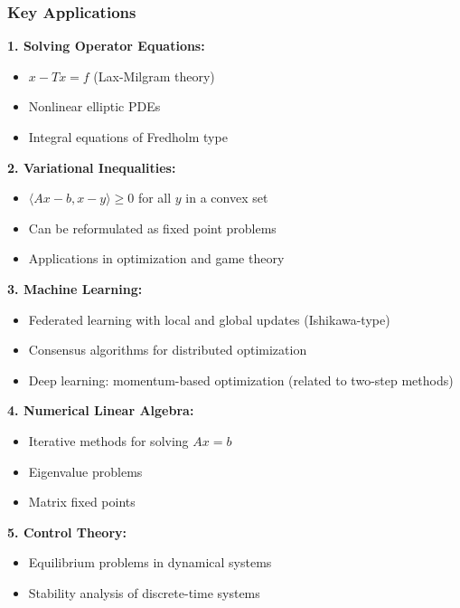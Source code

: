 \documentclass[aspectratio=169,10pt]{beamer}
\begin{document}
\begin{frame}
\frametitle{Key Applications}

\textbf{1. Solving Operator Equations:}
\begin{itemize}
    \item $x - Tx = f$ (Lax-Milgram theory)
    \item Nonlinear elliptic PDEs
    \item Integral equations of Fredholm type
\end{itemize}

\vspace{0.3cm}

\textbf{2. Variational Inequalities:}
\begin{itemize}
    \item $\langle Ax - b, x - y \rangle \geq 0$ for all $y$ in a convex set
    \item Can be reformulated as fixed point problems
    \item Applications in optimization and game theory
\end{itemize}

\vspace{0.3cm}

\textbf{3. Machine Learning:}
\begin{itemize}
    \item Federated learning with local and global updates (Ishikawa-type)
    \item Consensus algorithms for distributed optimization
    \item Deep learning: momentum-based optimization (related to two-step methods)
\end{itemize}

\vspace{0.3cm}

\textbf{4. Numerical Linear Algebra:}
\begin{itemize}
    \item Iterative methods for solving $Ax = b$
    \item Eigenvalue problems
    \item Matrix fixed points
\end{itemize}

\vspace{0.3cm}

\textbf{5. Control Theory:}
\begin{itemize}
    \item Equilibrium problems in dynamical systems
    \item Stability analysis of discrete-time systems
\end{itemize}

\end{frame}
\end{document}
